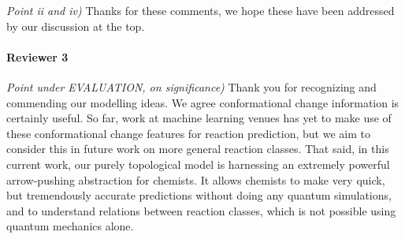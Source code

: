 \documentclass{article}
\begin{document}
 
\emph{Point ii and iv)} Thanks for these comments, we hope these have been addressed by our discussion at the top.




\paragraph{Reviewer 3}
\emph{Point under EVALUATION, on significance)}
Thank you for recognizing and commending our modelling ideas. We agree conformational change information is certainly useful. So far, work at machine learning venues has yet to make use of these conformational change features for reaction prediction, but we aim to consider this in future work on more general reaction classes. That said, in this current work, our purely topological model is harnessing an extremely powerful arrow-pushing abstraction for chemists. It allows chemists to make very quick, but tremendously accurate predictions without doing any quantum simulations, and to understand relations between reaction classes, which is not possible using quantum mechanics alone. 
\end{document}

